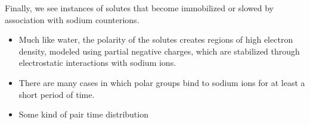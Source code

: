 \documentclass{article}
\begin{document}
  Finally, we see instances of solutes that become immobilized or slowed by 
  association with sodium counterions. 
  \begin{itemize}
    \item Much like water, the polarity of the solutes creates regions of high
    electron density, modeled using partial negative charges, which are stabilized
    through electrostatic interactions with sodium ions.
    \item There are many cases in which polar groups bind to sodium ions for at
    least a short period of time. 
    \item Some kind of pair time distribution  %
  \end{itemize}
  
\end{document}
